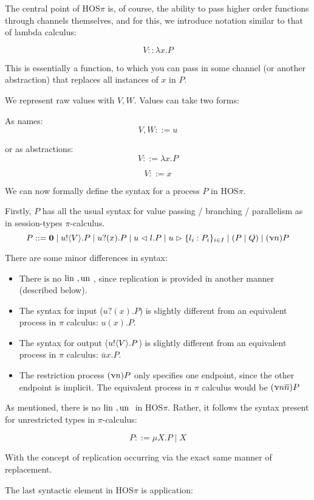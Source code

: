 The central point of HOS$\pi$ is, of course, the ability to pass higher order functions through channels themselves, and for this, we introduce notation similar to that of lambda calculus:

$$
V :: \lambda x.  P
$$

This is essentially a function, to which you can pass in some channel (or another abstraction) that replaces all instances of $x$ in $P$. 

We represent raw values with $V,W$. Values can take two forms:

As names:
$$
V, W ::= u
$$

or as abstractions:
$$
V ::= \lambda x . P
$$

$$
V ::= x
$$

We can now formally define the syntax for a process $P$ in HOS$\pi$.

Firstly, $P$ has all the usual syntax for value passing / branching / parallelism as in session-types $\pi$-calculus.
$$
P ::= \textbf{0} \mid u!\langle V \rangle.P \mid u?(x).P \mid u \vartriangleleft l.P \mid u \vartriangleright \{l_i : P_i\}_{i \in I} \mid (P \mid Q)  \mid (\upnu n) P
$$

There are some minor differences in syntax:
\begin{itemize}
    \item There is no $\text{lin }, \text{un }$, since replication is provided in another manner (described below).
    \item The syntax for input ($u ? (x) . P$) is slightly different from an equivalent process in $\pi$ calculus: $u(x) . P$.
    \item The syntax for output ($u! \langle V \rangle.P$) is slightly different from an equivalent process in $\pi$ calculus: $\bar{u}x.P$.
    \item The restriction process $(\upnu n) P$ only specifies one endpoint, since the other endpoint is implicit. The equivalent process in $\pi$ calculus would be $(\upnu n \overline{n}) P$
\end{itemize}

As mentioned, there is no $\text{lin }, \text{un }$ in HOS$\pi$. Rather, it follows the syntax present for unrestricted types in $\pi$-calculus:

$$
P ::= \mu X . P \mid X
$$

With the concept of replication occurring via the exact same manner of replacement.

The last syntactic element in HOS$\pi$ is application:

